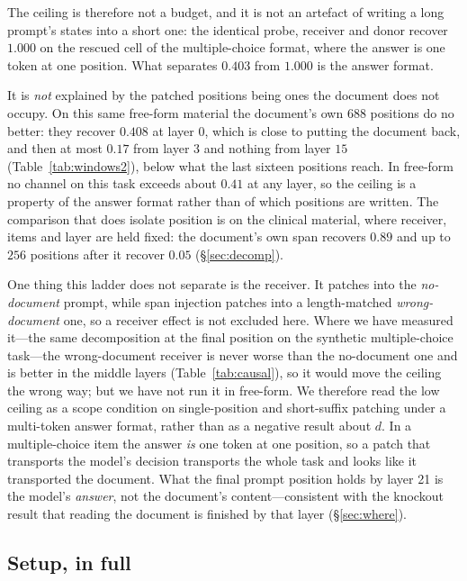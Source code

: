 \documentclass{article}
\newcommand{\dvec}{\ensuremath{d}}
\begin{document}
The ceiling is therefore not a budget, and it is not an artefact of writing a
long prompt's states into a short one: the identical probe, receiver and donor
recover $1.000$ on the rescued cell of the multiple-choice format, where the
answer is one token at one position. What separates $0.403$ from $1.000$ is the
answer format.

It is \emph{not} explained by the patched positions being ones the document
does not occupy. On this same free-form material the document's own $688$
positions do no better: they recover $0.408$ at layer $0$, which is close to
putting the document back, and then at most $0.17$ from layer $3$ and nothing
from layer $15$ (Table~\ref{tab:windows2}), below what the last sixteen
positions reach. In free-form no channel on this task exceeds about $0.41$ at
any layer, so the ceiling is a property of the answer format rather than of
which positions are written. The comparison that does isolate position is on
the clinical material, where receiver, items and layer are held fixed: the
document's own span recovers $0.89$ and up to $256$ positions after it recover
$0.05$ (\S\ref{sec:decomp}).

One thing this ladder does not separate is the receiver. It patches into the
\emph{no-document} prompt, while span injection patches into a length-matched
\emph{wrong-document} one, so a receiver effect is not excluded here. Where we
have measured it---the same decomposition at the final position on the
synthetic multiple-choice task---the wrong-document receiver is never worse
than the no-document one and is better in the middle layers
(Table~\ref{tab:causal}), so it would move the ceiling the wrong way; but we
have not run it in free-form. We therefore read the low ceiling as a scope
condition on single-position and short-suffix patching under a multi-token
answer format, rather than as a negative result about $\dvec$. In a multiple-choice
item the answer \emph{is} one token at one position, so a patch that transports
the model's decision transports the whole task and looks like it transported the
document. What the final prompt position holds by layer 21 is the model's
\emph{answer}, not the document's content---consistent with the knockout result
that reading the document is finished by that layer (\S\ref{sec:where}).

\subsection{Setup, in full}
\label{app:setup}
\end{document}
